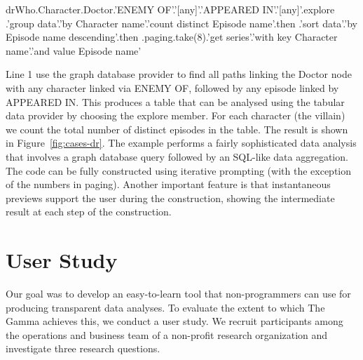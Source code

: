 \documentclass[manuscript,review,anonymous]{acmart}
\newcommand{\ikvd}[1]{{\fontfamily{zi4}\selectfont\small #1}}
\begin{document}
\begin{thegamma}
drWho.Character.Doctor.'ENEMY OF'.'[any]'.'APPEARED IN'.'[any]'.explore
  .'group data'.'by Character name'.'count distinct Episode name'.then
  .'sort data'.'by Episode name descending'.then
  .paging.take(8).'get series'.'with key Character name'.'and value Episode name'
\end{thegamma}

\noindent
Line 1 use the graph database provider to find all paths linking the Doctor node with any
character linked via \ikvd{ENEMY OF}, followed by any episode linked by \ikvd{APPEARED IN}.
This produces a table that can be analysed using the tabular data provider by choosing the
\ikvd{explore} member. For each character (the villain) we count the total number of
distinct episodes in the table. The result is shown in Figure~\ref{fig:cases-dr}.
The example performs a fairly sophisticated data analysis that involves a graph database query
followed by an SQL-like data aggregation. The code can be fully constructed using iterative
prompting (with the exception of the numbers in paging). Another important feature is that
instantaneous previews support the user during the construction, showing the intermediate result
at each step of the construction.




\section{User Study}
\label{sec:study}

Our goal was to develop an easy-to-learn tool that non-programmers can use
for producing transparent data analyses. To evaluate the extent to which The Gamma achieves this,
we conduct a user study. We recruit participants among the operations and business team of a
non-profit research organization and investigate three research questions.
\end{document}
